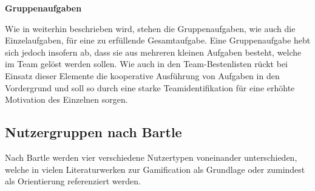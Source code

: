 \documentclass[bibliography=totoc,listof=totoc,BCOR=5mm,DIV=12,oneside]{scrbook}
\begin{document}
\par \bigskip \textbf{Gruppenaufgaben}
\par Wie in \citep[Kapitel 6.1.1 Tasks]{pflanzl2018gamification} weiterhin beschrieben wird, stehen die Gruppenaufgaben, wie auch die Einzelaufgaben, für eine zu erfüllende Gesamtaufgabe. Eine Gruppenaufgabe hebt sich jedoch insofern ab, dass sie aus mehreren kleinen Aufgaben besteht, welche im Team gelöst werden sollen. Wie auch in den Team-Bestenlisten rückt bei Einsatz dieser Elemente die kooperative Ausführung von Aufgaben in den Vordergrund und soll so durch eine starke Teamidentifikation für eine erhöhte Motivation des Einzelnen sorgen.

\subsection{Nutzergruppen nach Bartle} \label{sub:nutzergruppenBartle}
\par Nach Bartle \citep{bartle1996hearts} werden vier verschiedene Nutzertypen voneinander unterschieden, welche in vielen Literaturwerken zur Gamification als Grundlage oder zumindest als Orientierung referenziert werden.
 
\end{document}

